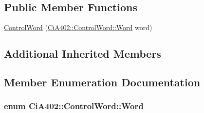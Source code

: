 \subsection*{Public Member Functions}
\begin{DoxyCompactItemize}
\item 
\hyperlink{struct_ci_a402_1_1_control_word_aa4ed7eeae15901f1c98319eba7f8306e}{Control\-Word} (\hyperlink{struct_ci_a402_1_1_control_word_a4c55c383fb4ebea7f52beaea4d232117}{Ci\-A402\-::\-Control\-Word\-::\-Word} word)
\end{DoxyCompactItemize}
\subsection*{Additional Inherited Members}


\subsection{Member Enumeration Documentation}
\hypertarget{struct_ci_a402_1_1_control_word_a4c55c383fb4ebea7f52beaea4d232117}{
\subsubsection[{Word}]{\setlength{\rightskip}{0pt plus 5cm}enum {\bf Ci\-A402\-::\-Control\-Word\-::\-Word}}}\label{struct_ci_a402_1_1_control_word_a4c55c383fb4ebea7f52beaea4d232117}
